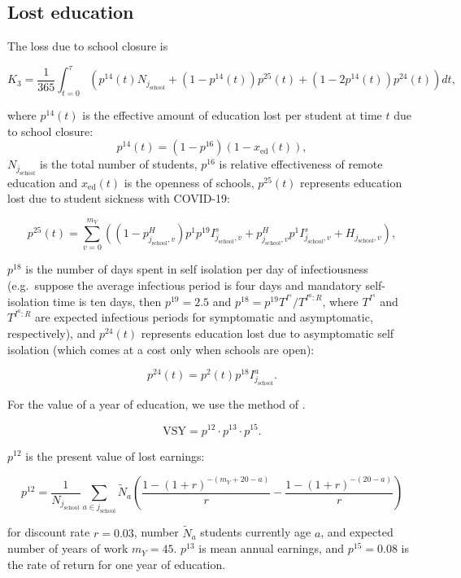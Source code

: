 \documentclass[
]{article}
\begin{document}
\subsection{Lost education}\label{lost-education}

The loss due to school closure is

\[K_3 =  \frac{1 }{365} \int_{t=0}^{\tau}\left(p^{14}(t)N_{j_{\text{school}}} + (1-p^{14}(t))p^{25}(t)  +(1-2p^{14}(t))p^{24}(t)\right)dt,\]

where \(p^{14}(t)\) is the effective amount of education lost per student at time \(t\) due to school closure:
\[p^{14}(t) = (1-p^{16})(1-x_{\text{ed}}(t)),\]
\(N_{j_{\text{school}}}\) is the total number of students, \(p^{16}\) is relative effectiveness of remote education and \(x_{\text{ed}}(t)\) is the openness of schools, \(p^{25}(t)\) represents education lost due to student sickness with COVID-19:

\[p^{25}(t)=\sum_{v=0}^{m_V}\left((1-p^H_{j_{\text{school}},v})p^1p^{19}I_{j_{\text{school}},v}^{s}+p^H_{j_{\text{school}},v}p^1I_{j_{\text{school}},v}^{s}+H_{j_{\text{school}},v}\right),\]

\(p^{18}\) is the number of days spent in self isolation per day of infectiousness (e.g.~suppose the average infectious period is four days and mandatory self-isolation time is ten days, then \(p^{19}=2.5\) and \(p^{18}=p^{19}T^{I^s}/T^{I^a:R}\), where \(T^{I^s}\) and \(T^{I^a:R}\) are expected infectious periods for symptomatic and asymptomatic, respectively), and \(p^{24}(t)\) represents education lost due to asymptomatic self isolation (which comes at a cost only when schools are open):

\[p^{24}(t)=p^2(t)p^{18}I_{j_{\text{school}}}^{a}.\]

For the value of a year of education, we use the method of \citep{Psacharopoulos2021a}.

\[\text{VSY} =  p^{12}\cdot p^{13}\cdot p^{15}.\]

\(p^{12}\) is the present value of lost earnings:

\[p^{12} = \frac{1}{N_{j_{\text{school}}}}\sum_{a\in j_{\text{school}}}\tilde{N}_a\left( \frac{1-(1+r)^{-(m_Y+20-a)}}{r} -  \frac{1-(1+r)^{-(20-a)}}{r}\right)\]

for discount rate \(r=0.03\), number \(\tilde{N}_a\) students currently age \(a\), and expected number of years of work \(m_Y=45\). \(p^{13}\) is mean annual earnings, and \(p^{15}=0.08\) is the rate of return for one year of education.
\end{document}
